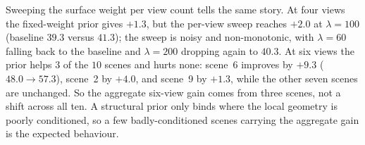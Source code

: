 Sweeping the surface weight per view count tells the same story. At four views the fixed-weight prior gives $+1.3$, but the per-view sweep reaches $+2.0$ at $\lambda = 100$ (baseline $39.3$ versus $41.3$); the sweep is noisy and non-monotonic, with $\lambda = 60$ falling back to the baseline and $\lambda = 200$ dropping again to $40.3$. At six views the prior helps $3$ of the $10$ scenes and hurts none: scene~6 improves by $+9.3$ ($48.0 \to 57.3$), scene~2 by $+4.0$, and scene~9 by $+1.3$, while the other seven scenes are unchanged. So the aggregate six-view gain comes from three scenes, not a shift across all ten. A structural prior only binds where the local geometry is poorly conditioned, so a few badly-conditioned scenes carrying the aggregate gain is the expected behaviour.
